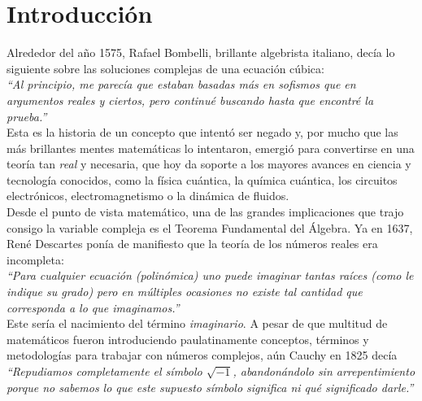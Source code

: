 \documentclass[../main.tex]{memoir}
\begin{document}
\chapter{Introducción}

Alrededor del año 1575, Rafael Bombelli, brillante algebrista italiano, decía lo siguiente sobre las soluciones complejas de una ecuación cúbica: \\

\textit{``Al principio, me parecía que estaban basadas más en sofismos que en argumentos reales y ciertos, pero continué buscando hasta que encontré la prueba.''} \\

Esta es la historia de un concepto que intentó ser negado y, por mucho que las más brillantes mentes matemáticas lo intentaron, emergió para convertirse en una teoría tan \textit{real} y necesaria, que hoy da soporte a los mayores avances en ciencia y tecnología conocidos, como la física cuántica, la química cuántica, los circuitos electrónicos, electromagnetismo o la  dinámica de fluidos. \\

Desde el punto de vista matemático, una de las grandes implicaciones que trajo consigo la variable compleja es el Teorema Fundamental del Álgebra. Ya en 1637, René Descartes ponía de manifiesto que la teoría de los números reales era incompleta: \\

\textit{``Para cualquier ecuación (polinómica) uno puede imaginar tantas raíces (como le indique su grado) pero en múltiples ocasiones no existe tal cantidad que corresponda a lo que imaginamos.''} \\

Este sería el nacimiento del término \textit{imaginario}. A pesar de que multitud de matemáticos fueron introduciendo paulatinamente conceptos, términos y metodologías para trabajar con números complejos, aún Cauchy en 1825 decía \\

\textit{``Repudiamos completamente el símbolo $\sqrt{-1}$, abandonándolo sin arrepentimiento porque no sabemos lo que este supuesto símbolo significa ni qué significado darle.''} \\
\end{document}
